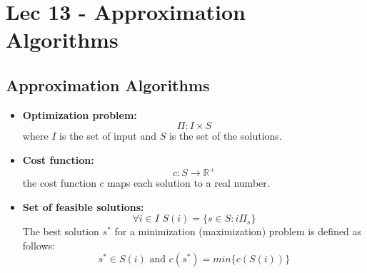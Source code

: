\chapter{Lec 13 - Approximation Algorithms}

\section{Approximation Algorithms}
\begin{itemize}
    \item \textbf{Optimization problem:}
    \[\Pi: I \times S\]
    where $I$ is the set of input and $S$ is the set of the solutions.

    \item \textbf{Cost function:}
    \[c: S \rightarrow \mathbb{R}^+\]
    the cost function $c$ maps each solution to a real number.

    \item \textbf{Set of feasible solutions:}
    \[\forall i \in I \,\, S(i) = \{s \in S: i\Pi_s\}\]
    The best solution $s^*$ for a minimization (maximization) problem is defined as follows:
    \[s^* \in S(i) \,\, \text{and} \,\, c(s^*) = min \{c(S(i))\}\]
\end{itemize}

